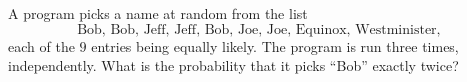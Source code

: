 A program picks a name at random from the list
\[
\text{Bob, Bob, Jeff, Jeff, Bob, Joe, Joe, Equinox, Westminister},
\]
each of the $9$ entries being equally likely. The program is run three times, independently. What is the probability that it picks ``Bob'' exactly twice?
